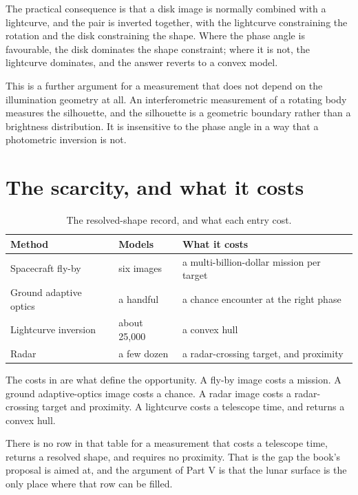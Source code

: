 The practical consequence is that a disk image is normally combined with a
lightcurve, and the pair is inverted together, with the lightcurve
constraining the rotation and the disk constraining the shape. Where the
phase angle is favourable, the disk dominates the shape constraint; where it
is not, the lightcurve dominates, and the answer reverts to a convex model.

This is a further argument for a measurement that does not depend on the
illumination geometry at all. An interferometric measurement of a rotating
body measures the silhouette, and the silhouette is a geometric boundary
rather than a brightness distribution. It is insensitive to the phase angle
in a way that a photometric inversion is not.

\section{The scarcity, and what it costs}

\begin{table}[!htbp]
\centering
\small
\caption{The resolved-shape record, and what each entry cost.}
\label{tab:resolved-record}
\begin{tabularx}{\textwidth}{@{}P{1.43in}P{1.13in}Y@{}}
\toprule
{}
\textbf{Method} & \textbf{Models} & \textbf{What it costs} \\
\midrule
Spacecraft fly-by & six images & a multi-billion-dollar mission per target \\
Ground adaptive optics & a handful & a chance encounter at the right phase \\
Lightcurve inversion & about 25,000 & a convex hull \\
Radar & a few dozen & a radar-crossing target, and proximity \\
\bottomrule
\end{tabularx}
\end{table}

The costs in  are what define the opportunity.
A fly-by image costs a mission. A ground adaptive-optics image costs a
chance. A radar image costs a radar-crossing target and proximity. A
lightcurve costs a telescope time, and returns a convex hull.

There is no row in that table for a measurement that costs a telescope time,
returns a resolved shape, and requires no proximity. That is the gap the
book's proposal is aimed at, and the argument of Part V is that the
lunar surface is the only place where that row can be filled.

